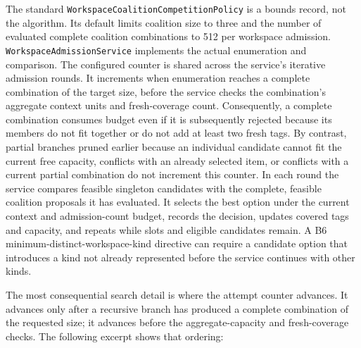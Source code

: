 The standard \texttt{Workspace\allowbreak{}Coalition\allowbreak{}Competition\allowbreak{}Policy} is a bounds record, not the algorithm. Its default limits coalition size to three and the number of evaluated complete coalition combinations to 512 per workspace admission. \texttt{Workspace\allowbreak{}Admission\allowbreak{}Service} implements the actual enumeration and comparison. The configured counter is shared across the service's iterative admission rounds. It increments when enumeration reaches a complete combination of the target size, before the service checks the combination's aggregate context units and fresh-coverage count. Consequently, a complete combination consumes budget even if it is subsequently rejected because its members do not fit together or do not add at least two fresh tags. By contrast, partial branches pruned earlier because an individual candidate cannot fit the current free capacity, conflicts with an already selected item, or conflicts with a current partial combination do not increment this counter. In each round the service compares feasible singleton candidates with the complete, feasible coalition proposals it has evaluated. It selects the best option under the current context and admission-count budget, records the decision, updates covered tags and capacity, and repeats while slots and eligible candidates remain. A B6 minimum-distinct-workspace-kind directive can require a candidate option that introduces a kind not already represented before the service continues with other kinds.

The most consequential search detail is where the attempt counter advances. It advances only after a recursive branch has produced a complete combination of the requested size; it advances before the aggregate-capacity and fresh-coverage checks. The following excerpt shows that ordering:

